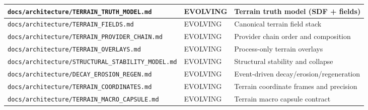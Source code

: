 \documentclass[9pt,a4paper,openany]{book}
\newcommand{\toprule}{\hline}
\newcommand{\midrule}{\hline}
\newcommand{\bottomrule}{\hline}
\begin{document}
\begin{center}
{\small\renewcommand{\arraystretch}{1.18}
\begin{tabularx}{\linewidth}{@{}>{\raggedright\arraybackslash}X >{\raggedright\arraybackslash}X >{\raggedright\arraybackslash}X@{}}
\toprule
\textbf{\texttt{docs/\allowbreak{}architecture/\allowbreak{}TERRAIN\_\allowbreak{}TRUTH\_\allowbreak{}MODEL.\allowbreak{}md}} & \textbf{EVOLVING} & \textbf{Terrain truth model (SDF + fields)} \\
\midrule
\texttt{docs/\allowbreak{}architecture/\allowbreak{}TERRAIN\_\allowbreak{}FIELDS.\allowbreak{}md} & EVOLVING & Canonical terrain field stack \\
\texttt{docs/\allowbreak{}architecture/\allowbreak{}TERRAIN\_\allowbreak{}PROVIDER\_\allowbreak{}CHAIN.\allowbreak{}md} & EVOLVING & Provider chain order and composition \\
\texttt{docs/\allowbreak{}architecture/\allowbreak{}TERRAIN\_\allowbreak{}OVERLAYS.\allowbreak{}md} & EVOLVING & Process-\allowbreak{}only terrain overlays \\
\texttt{docs/\allowbreak{}architecture/\allowbreak{}STRUCTURAL\_\allowbreak{}STABILITY\_\allowbreak{}MODEL.\allowbreak{}md} & EVOLVING & Structural stability and collapse \\
\texttt{docs/\allowbreak{}architecture/\allowbreak{}DECAY\_\allowbreak{}EROSION\_\allowbreak{}REGEN.\allowbreak{}md} & EVOLVING & Event-\allowbreak{}driven decay/\allowbreak{}erosion/\allowbreak{}regeneration \\
\texttt{docs/\allowbreak{}architecture/\allowbreak{}TERRAIN\_\allowbreak{}COORDINATES.\allowbreak{}md} & EVOLVING & Terrain coordinate frames and precision \\
\texttt{docs/\allowbreak{}architecture/\allowbreak{}TERRAIN\_\allowbreak{}MACRO\_\allowbreak{}CAPSULE.\allowbreak{}md} & EVOLVING & Terrain macro capsule contract \\
\bottomrule
\end{tabularx}
}
\end{center}
\end{document}
